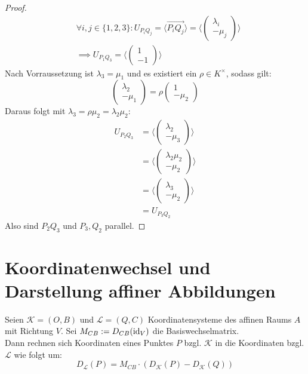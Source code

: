 \documentclass[parskip,a4paper,twoside,DIV15,BCOR12mm]{scrbook}
\begin{document}
\begin{proof}
\begin{align*}
&\forall i,j\in \{1,2,3\}:U_{P_iQ_j}=\langle\overrightarrow{P_iQ_j}\rangle =\langle 
\begin{pmatrix}\lambda_i\\-\mu_j\end{pmatrix}\rangle\\
&\implies U_{P_1Q_3}=\langle \begin{pmatrix}1\\-1\end{pmatrix}\rangle
\end{align*}
Nach Vorraussetzung ist $\lambda_3=\mu_1$ und es existiert ein $\rho\in K^\times$, sodass gilt:
\[ \begin{pmatrix}\lambda_2\\-\mu_1 \end{pmatrix}=\rho\begin{pmatrix}1\\-\mu_2\end{pmatrix}\]
Daraus folgt mit $\lambda_3=\rho\mu_2=\lambda_2\mu_2$:
\begin{align*}
U_{P_2Q_3}&=\langle \begin{pmatrix}\lambda_2 \\-\mu_3 \end{pmatrix}\rangle\\
&=\langle \begin{pmatrix} \lambda_2\mu_2\\-\mu_2 \end{pmatrix}\rangle\\
&=\langle \begin{pmatrix} \lambda_3\\-\mu_2 \end{pmatrix}\rangle\\
&= U_{P_3Q_2}
\end{align*}
Also sind $P_2Q_3$ und $P_3,Q_2$ parallel.
\end{proof}

\section{Koordinatenwechsel und Darstellung affiner Abbildungen}
\begin{lemma}
Seien $\mathcal{K}=(O,B)$ und $\mathcal{L}=(Q,C)$ Koordinatensysteme des affinen Raums
$A$ mit Richtung $V$. Sei $M_{CB}:=D_{CB}(\operatorname{id}_V)$ die Basiswechselmatrix.\\
Dann rechnen sich Koordinaten eines Punktes $P$ bzgl. $\mathcal{K}$ in die
Koordinaten bzgl. $\mathcal{L}$ wie folgt um:
\[D_\mathcal{L}(P)=M_{CB}\cdot(D_\mathcal{K}(P)-D_\mathcal{K}(Q))\]
\end{lemma}
\end{document}
